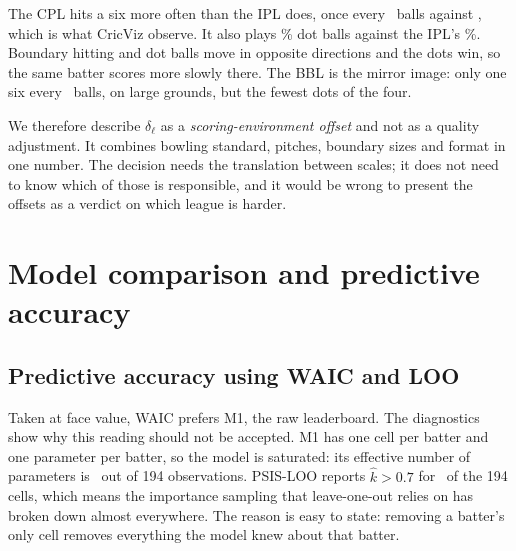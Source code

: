 \documentclass[11pt,a4paper]{article}
\begin{document}
\begin{table}[H]
\centering\small

\caption{How each competition scores, 2021--2024. The CPL clears the rope most often and
also plays the most dot balls, which is why its overall strike rate is the lowest of the four.}
\end{table}

The CPL hits a six more often than the IPL does, once every \nbpsCpl\ balls against
\nbpsIpl, which is what CricViz observe. It also plays \ndotCpl\% dot balls against the IPL's
\ndotIpl\%. Boundary hitting and dot balls move in opposite directions and the dots win, so the
same batter scores more slowly there. The BBL is the mirror image: only one six every
\nbpsBbl\ balls, on large grounds, but the fewest dots of the four.

We therefore describe $\delta_\ell$ as a \emph{scoring-environment offset} and not as a quality
adjustment. It combines bowling standard, pitches, boundary sizes and format in one number. The
decision needs the translation between scales; it does not need to know which of those is
responsible, and it would be wrong to present the offsets as a verdict on which league is
harder.

\section{Model comparison and predictive accuracy}\label{sec:compare}

\subsection{Predictive accuracy using WAIC and LOO}

\begin{table}[H]
\centering\small\setlength{\tabcolsep}{3pt}

\caption{WAIC and PSIS-LOO for the four models, all evaluated on the same 194 IPL
cells so that the numbers are comparable. $\hat{k}$ is the Pareto shape from PSIS; values above
0.7 mean the estimate for that cell is unreliable.}
\end{table}

Taken at face value, WAIC prefers M1, the raw leaderboard. The diagnostics show why this
reading should not be accepted. M1 has one cell per batter and one parameter per batter, so the
model is saturated: its effective number of parameters is \npwaicMone\ out of 194
observations. PSIS-LOO reports $\hat{k} > 0.7$ for \nkhatBadMone\ of the 194 cells, which
means the importance sampling that leave-one-out relies on has broken down almost everywhere.
The reason is easy to state: removing a batter's only cell removes everything the model knew
about that batter.
\end{document}
